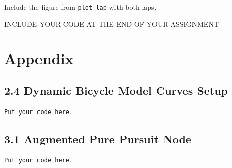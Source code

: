 \documentclass{article}
\begin{document}
\vspace{5mm}
Include the figure from \texttt{plot\_lap} with both laps.

INCLUDE YOUR CODE AT THE END OF YOUR ASSIGNMENT

\newpage
\section{Appendix}

\subsection{2.4 Dynamic Bicycle Model Curves Setup}
\begin{verbatim}
Put your code here.
\end{verbatim}

\subsection{3.1 Augmented Pure Pursuit Node}
\begin{verbatim}
Put your code here.
\end{verbatim}
\end{document}
